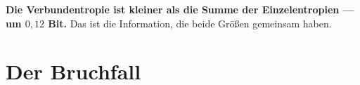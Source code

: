 \begin{merksatz}
\begin{center}
\begin{minipage}{0.9\textwidth}
\textbf{Die Verbundentropie ist kleiner als die Summe der Einzelentropien --- um $0{,}12$ Bit.} Das ist die Information, die beide Größen gemeinsam haben.
\end{minipage}
\end{center}

\begin{center}
\begin{minipage}{0.88\textwidth}
\end{minipage}
\end{center}
\end{merksatz}

\section{Der Bruchfall}

